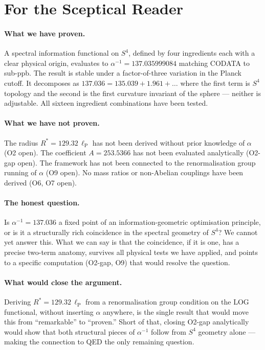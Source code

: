 \documentclass[12pt,a4paper]{article}
\newcommand{\lP}{\ell_{\mathrm{P}}}
\begin{document}
\section{For the Sceptical Reader}
\label{sec:honest}

\paragraph{What we have proven.}
A spectral information functional on $S^4$,
defined by four ingredients each with a clear
physical origin, evaluates to $\alpha^{-1} = 137.035999084$
matching CODATA to sub-ppb.
The result is stable under a factor-of-three
variation in the Planck cutoff.
It decomposes as $137.036 = 135.039 + 1.961 + \ldots$
where the first term is $S^4$ topology and the second
is the first curvature invariant of the sphere ---
neither is adjustable.
All sixteen ingredient combinations have been tested.

\paragraph{What we have not proven.}
The radius $R^* = 129.32\,\lP$ has not been
derived without prior knowledge of $\alpha$ (O2 open).
The coefficient $A = 253.5366$ has not been
evaluated analytically (O2-gap open).
The framework has not been connected to the
renormalisation group running of $\alpha$ (O9 open).
No mass ratios or non-Abelian couplings have been
derived (O6, O7 open).

\paragraph{The honest question.}
Is $\alpha^{-1} = 137.036$ a fixed point of an
information-geometric optimisation principle,
or is it a structurally rich coincidence in the
spectral geometry of $S^4$?
We cannot yet answer this.
What we can say is that the coincidence, if it is one,
has a precise two-term anatomy, survives all physical
tests we have applied, and points to a specific
computation (O2-gap, O9) that would resolve the question.

\paragraph{What would close the argument.}
Deriving $R^* = 129.32\,\lP$ from a renormalisation
group condition on the LOG functional, without
inserting $\alpha$ anywhere, is the single result
that would move this from ``remarkable'' to ``proven.''
Short of that, closing O2-gap analytically would
show that both structural pieces of $\alpha^{-1}$
follow from $S^4$ geometry alone --- making the
connection to QED the only remaining question.
\end{document}
